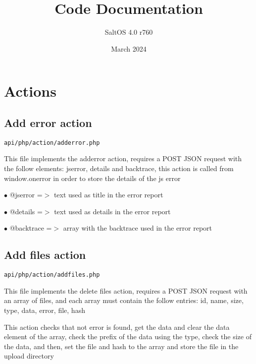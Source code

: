 \documentclass[a4paper]{book}
\title{Code Documentation}
\author{SaltOS 4.0 r760}
\begin{document}
\date{March 2024}
\maketitle
\clearpage

\tableofcontents
\clearpage


\hypertarget{toc1}{}
\chapter{Actions}

\hypertarget{toc2}{}
\section{Add error action}

\begin{lstlisting}
api/php/action/adderror.php
\end{lstlisting}

This file implements the adderror action, requires a POST JSON request
with the follow elements: jserror, details and backtrace, this action
is called from window.onerror in order to store the details of the js
error

\begin{compactitem}
\item[\color{myblue}$\bullet$] @jserror   =$>$ text used as title in the error report
\item[\color{myblue}$\bullet$] @details   =$>$ text used as details in the error report
\item[\color{myblue}$\bullet$] @backtrace =$>$ array with the backtrace used in the error report
\end{compactitem}

\hypertarget{toc3}{}
\section{Add files action}

\begin{lstlisting}
api/php/action/addfiles.php
\end{lstlisting}

This file implements the delete files action, requires a POST JSON request
with an array of files, and each array must contain the follow entries:
id, name, size, type, data, error, file, hash

This action checks that not error is found, get the data and clear the
data element of the array, check the prefix of the data using the type,
check the size of the data, and then, set the file and hash to the
array and store the file in the upload directory
\end{document}
